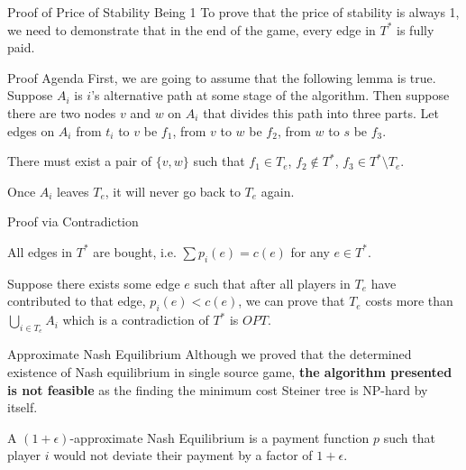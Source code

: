 \documentclass[11pt,aspectratio=169]{beamer}
\begin{document}
\begin{frame}{Proof of Price of Stability Being 1}
To prove that the price of stability is always 1, we need to demonstrate that in the end of the game, every edge in \(T^*\) is fully paid. 
\end{frame}

\begin{frame}{Proof Agenda}
First, we are going to assume that the following lemma is true. 
\vspace{10pt}\\
Suppose \(A_i\) is \(i\)'s alternative path at some stage of the algorithm. Then suppose there are two nodes \(v\) and \(w\) on \(A_i\) that divides this path into three parts. Let edges on \(A_i\) from \(t_i\) to \(v\) be \(f_1\), from \(v\) to \(w\) be \(f_2\), from \(w\) to \(s\) be \(f_3\).
\vspace{10pt}
\begin{lemma}
	There must exist a pair of \(\{v,w\}\) such that \(f_1 \in T_e\), \(f_2 \notin T^*\), \(f_3 \in T^*\setminus T_e\).
\end{lemma}
\vspace{10pt}
Once \(A_i\) leaves \(T_e\), it will never go back to \(T_e\) again.
\end{frame}

\begin{frame}{Proof via Contradiction}
\begin{lemma}
	All edges in \(T^*\) are bought, i.e. $\sum p_i(e) = c(e)$ for any $e \in T^*$.
\end{lemma}

Suppose there exists some edge \(e\) such that after all players in \(T_e\) have contributed to that edge, \(p_i(e) < c(e)\), we can prove that \(T_e\) costs more than \(\bigcup_{i\in T_e} A_i\) which is a contradiction of \(T^*\) is \(OPT\).
\end{frame}

\begin{frame}{Approximate Nash Equilibrium}
    Although we proved that the determined existence of Nash equilibrium in single source game, \textbf{the algorithm presented is not feasible} as the finding the minimum cost Steiner tree is NP-hard by itself. \\
    \vspace{10pt}
\begin{definition}
	A \((1+\epsilon)\)-approximate Nash Equilibrium is a payment function \(p\) such that player \(i\) would not deviate their payment by a factor of \(1+\epsilon\).
\end{definition}
\end{frame}
\end{document}
